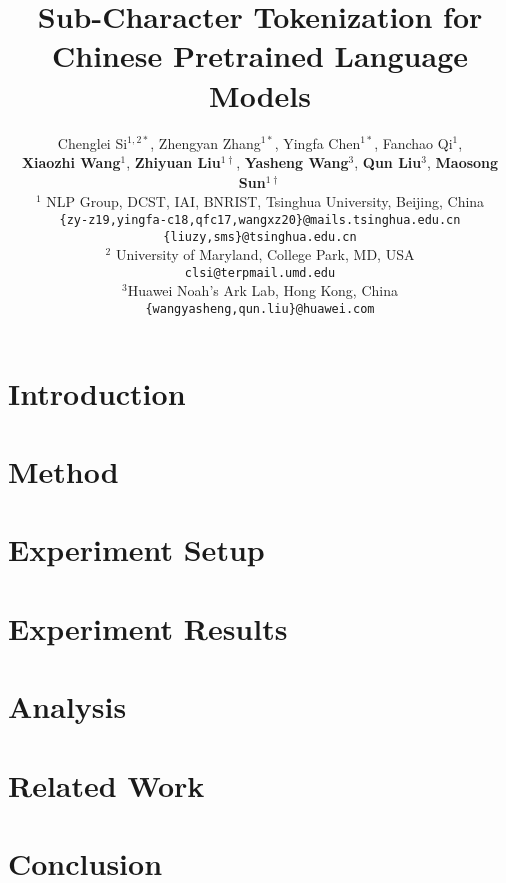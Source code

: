 \documentclass[11pt,a4paper]{article}
\title{Sub-Character Tokenization for Chinese Pretrained Language Models}
\author{Chenglei Si$^{1,2*}$, Zhengyan Zhang$^{1*}$, Yingfa Chen$^{1*}$, Fanchao Qi$^{1}$,  \\
 \textbf{Xiaozhi Wang}$^{1}$, \textbf{Zhiyuan Liu}$^{1\dagger}$, \textbf{Yasheng Wang}$^3$, \textbf{Qun Liu}$^3$, \textbf{Maosong Sun}$^{1\dagger}$\\
  $^1$ NLP Group, DCST, IAI, BNRIST, Tsinghua University, Beijing, China \\
  \texttt{\{zy-z19,yingfa-c18,qfc17,wangxz20\}@mails.tsinghua.edu.cn} \\
  \texttt{\{liuzy,sms\}@tsinghua.edu.cn}\\
  $^2$ University of Maryland, College Park, MD, USA \\
  \texttt{clsi@terpmail.umd.edu} \\
  $^3$Huawei Noah's Ark Lab, Hong Kong, China \\
         \texttt{\{wangyasheng,qun.liu\}@huawei.com}\\
}
\date{}
\begin{document}
\maketitle
\begin{CJK*}{UTF8}{gbsn}
\begin{abstract}
  
\end{abstract}



\section{Introduction}

{\let\thefootnote\relax{}}
{\let\thefootnote\relax{}}




\section{Method}



\section{Experiment Setup}



\section{Experiment Results}



\section{Analysis}




\section{Related Work}


\section{Conclusion}


\end{CJK*}
\end{document}
